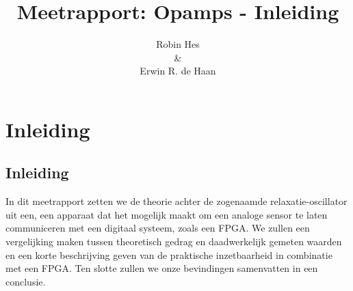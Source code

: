 \documentclass{report}
\title{Meetrapport: Opamps - Inleiding}
\author{Robin Hes\\\&\\Erwin R. de Haan}
\begin{document}
\chapter{Inleiding}

\section{Inleiding}
In dit meetrapport zetten we de theorie achter de zogenaamde relaxatie-oscillator uit een, een apparaat dat het mogelijk maakt om een analoge sensor te laten communiceren met een digitaal systeem, zoals een FPGA. We zullen een vergelijking maken tussen theoretisch gedrag en daadwerkelijk gemeten waarden en een korte beschrijving geven van de praktische inzetbaarheid in combinatie met een FPGA. Ten slotte zullen we onze bevindingen samenvatten in een conclusie.
\end{document}
